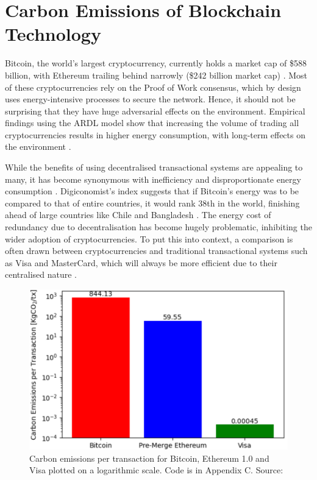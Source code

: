 
\section{Carbon Emissions of Blockchain Technology }

Bitcoin, the world's largest cryptocurrency, currently holds a market cap of \$588 billion, with Ethereum trailing behind narrowly (\$242 billion market cap) \cite{BitcoinCoinMarketCap}. Most of these cryptocurrencies rely on the Proof of Work consensus, which by design uses energy-intensive processes to secure the network. Hence, it should not be surprising that they have huge adversarial effects on the environment. Empirical findings using the ARDL model show that increasing the volume of trading all cryptocurrencies results in higher energy consumption, with long-term effects on the environment \cite{Schinckus2020Crypto-currenciesConsumption}. \newline 

While the benefits of using decentralised transactional systems are appealing to many, it has become synonymous with inefficiency and disproportionate energy consumption \cite{DeVriesBitcoinsProblem}. Digiconomist's index suggests that if Bitcoin's energy was to be compared to that of entire countries, it would rank 38th in the world, finishing ahead of large countries like Chile and Bangladesh \cite{BitcoinDigiconomist}. The energy cost of redundancy due to decentralisation has become hugely problematic, inhibiting the wider adoption of cryptocurrencies. To put this into context, a comparison is often drawn between cryptocurrencies and traditional transactional systems such as Visa and MasterCard, which will always be more efficient due to their centralised nature \cite{Kohli2023AnSolutions}.  

\begin{figure}[h]
    \centering
    \includegraphics[width=13cm,center]{Figures/CarbonEmissionsPlot.png}
    \caption{Carbon emissions per transaction for Bitcoin, Ethereum 1.0 and Visa plotted on a logarithmic scale. Code is in Appendix C. Source: \cite{Kohli2023AnSolutions} }
    \label{Figure:CarbonEmissionsPlot}
\end{figure}

